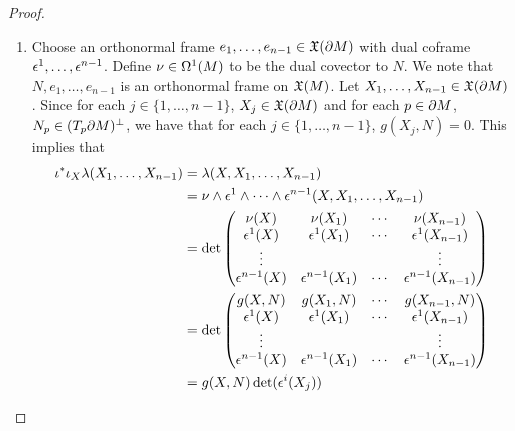 \documentclass{book}
\begin{document}
\begin{proof}
\begin{enumerate}
\begin{align*}
			& = \sum_{k=1}^n  g(e_k, z_i) g(e_k, z_j) \\
			& = (V^*V)_{i,j}
		\end{align*}
		we have that
		\begin{align*}
			\lam(e_1, \ldots, e_n)
			& = \det [g(z_i, z_j)]^{1/2} \ze^1 \wedge \cdots \wedge \ze^n(e_1, \ldots, e_n) \\
			& = \det [g(z_i, z_j)]^{1/2} \det [\ze^i(e_j)] \\
			& = \det (V^*V)^{1/2} \det U \\
			& = \det V (\det V)^{-1} \\
			& = 1
		\end{align*}
		\item Choose an orthonormal frame $e_1, \ldots, e_{n-1} \in \mathfrak{X}(\partial M)$ with dual coframe $\epsilon^1, \ldots, \epsilon^{n-1}$. Define $\nu \in \Omega^1(M)$ to be the dual covector to $N$. We note that $N, e_1, \ldots, e_{n-1}$ is an orthonormal frame on $\mathfrak{X}(M)$. Let $X_1, \ldots, X_{n-1} \in \mathfrak{X}(\partial M)$. Since for each $j \in \{1, \ldots, n-1\}$, $X_j \in \mathfrak{X}(\partial M)$ and for each $p \in \partial M$, $N_p \in (T_p \partial M)^{\perp}$, we have that for each $j \in \{1, \ldots, n-1\}$, $g(X_j, N) = 0$. This implies that 
		\begin{align*}
			\iota^* \iota_X \lam (X_1, \ldots, X_{n-1})
			& = \lam(X, X_1, \ldots, X_{n-1}) \\
			& = \nu \wedge \ep^1 \wedge \cdots \wedge \ep^{n-1} (X, X_1, \ldots, X_{n-1})  \\
			& = \det 
			\begin{pmatrix}
				\nu(X)     & \nu(X_1)     & \cdots & \nu(X_{n-1}) \\
				\ep^1(X) & \ep^1(X_1) & \cdots & \ep^1(X_{n-1}) \\ 
				\vdots   &            &        &  \vdots \\
				\ep^{n-1}(X) & \ep^{n-1}(X_1) & \cdots & \ep^{n-1}(X_{n-1})
			\end{pmatrix} \\
			& = \det 
			\begin{pmatrix}
				g(X, N)    & g(X_1, N)     & \cdots & g(X_{n-1}, N) \\
				\ep^1(X)   & \ep^1(X_1)    & \cdots & \ep^1(X_{n-1}) \\ 
				\vdots     &               &        &  \vdots \\
				\ep^{n-1}(X) & \ep^{n-1}(X_1) & \cdots & \ep^{n-1}(X_{n-1})
			\end{pmatrix} \\
			& = g(X, N) \det (\ep^i(X_j)) \\

\end{align*}
\end{enumerate}
\end{proof}
\end{document}
